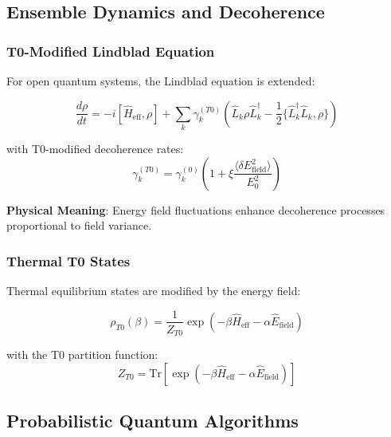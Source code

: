 \documentclass[12pt,a4paper]{article}
\newcommand{\xipar}{\xi}
\theoremstyle{definition}
\theoremstyle{remark}
\begin{document}
\subsection{Ensemble Dynamics and Decoherence}

\subsubsection{T0-Modified Lindblad Equation}

For open quantum systems, the Lindblad equation is extended:

\begin{equation}
	\boxed{\frac{d\rho}{dt} = -i[\hat{H}_{\text{eff}}, \rho] + \sum_k \gamma_k^{(T0)} \left( \hat{L}_k \rho \hat{L}_k^\dagger - \frac{1}{2}\{\hat{L}_k^\dagger \hat{L}_k, \rho\} \right)}
	\label{eq:t0_lindblad_en}
\end{equation}

with T0-modified decoherence rates:
\begin{equation}
	\gamma_k^{(T0)} = \gamma_k^{(0)} \left(1 + \xipar \frac{\langle \delta E_{\text{field}}^2 \rangle}{E_0^2}\right)
	\label{eq:modified_decoherence_en}
\end{equation}

\textbf{Physical Meaning}: Energy field fluctuations enhance decoherence processes proportional to field variance.

\subsubsection{Thermal T0 States}

Thermal equilibrium states are modified by the energy field:

\begin{equation}
	\rho_{T0}(\beta) = \frac{1}{Z_{T0}} \exp\left(-\beta \hat{H}_{\text{eff}} - \alpha \hat{E}_{\text{field}}\right)
	\label{eq:t0_thermal_state_en}
\end{equation}

with the T0 partition function:
\begin{equation}
	Z_{T0} = \text{Tr}\left[\exp\left(-\beta \hat{H}_{\text{eff}} - \alpha \hat{E}_{\text{field}}\right)\right]
	\label{eq:t0_partition_function_en}
\end{equation}

\subsection{Probabilistic Quantum Algorithms}
\end{document}
